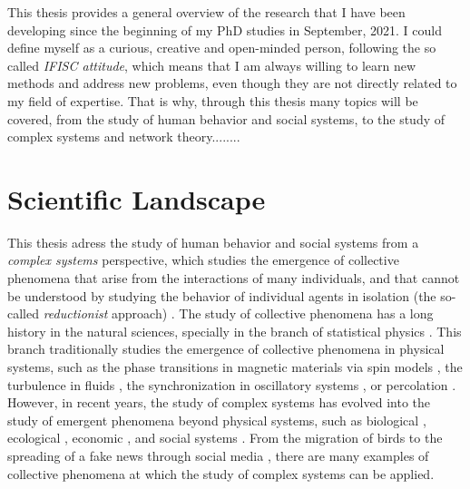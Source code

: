 \setcounter{page}{1}

This thesis provides a general overview of the research that I have been developing since the beginning of my PhD studies in September, 2021. I could define myself as a curious, creative and open-minded person, following the so called \textit{IFISC attitude}, which means that I am always willing to learn new methods and address new problems, even though they are not directly related to my field of expertise. That is why, through this thesis many topics will be covered, from the study of human behavior and social systems, to the study of complex systems and network theory........

\section{\label{sec:scie_lands} Scientific Landscape}

This thesis adress the study of human behavior and social systems from a \textit{complex systems} perspective, which studies the emergence of collective phenomena that arise from the interactions of many individuals, and that cannot be understood by studying the behavior of individual agents in isolation (the so-called \textit{reductionist} approach) \cite{anderson}. The study of collective phenomena has a long history in the natural sciences, specially in the branch of statistical physics \cite{stanley1971phase}. This branch traditionally studies the emergence of collective phenomena in physical systems, such as the phase transitions in magnetic materials via spin models \cite{onsager-1944}, the turbulence in fluids \cite{frisch1995turbulence}, the synchronization in oscillatory systems \cite{pikovsky2001universal}, or percolation \cite{stauffer-1985}. However, in recent years, the study of complex systems has evolved into the study of emergent phenomena beyond physical systems, such as biological \cite{prigogine1977self}, ecological \cite{may-2001}, economic \cite{arthur-1994}, and social systems \cite{castellano-2009}. From the migration of birds \cite{roche-1997} to the spreading of a fake news through social media \cite{vosoughi-2018}, there are many examples of collective phenomena at which the study of complex systems can be applied.

